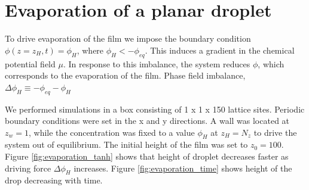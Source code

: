 \documentclass[11pt]{article}
\begin{document}
\section{Evaporation of a planar droplet}

To drive evaporation of the film we impose the boundary condition $\phi(z=z_{H},t)=\phi_{H}$, where $\phi_{H} < -\phi_{eq}$. This induces a gradient in the chemical potential field $\mu$. In response to this imbalance, the system reduces $\phi$, which corresponds to the evaporation of the film\cite{paper:evaporation}.
Phase field imbalance, $\Delta\phi_{H} \equiv -\phi_{eq} - \phi_{H}$
\par 
We performed simulations in a box consisting of  1 x 1 x 150 lattice sites. Periodic boundary conditions were set in the x and
y directions. A wall was located at $ z_{w} = 1 $, while the concentration
was fixed to a value $ \phi_{H}$ at $z_{H} = N_{z} $ to drive the system out of equilibrium. The initial height of the film was set to $z_{0} = 100$. Figure \ref{fig:evaporation_tanh} shows that height of droplet decreases faster as driving force $\Delta\phi_{H}$ increases. 
 Figure \ref{fig:evaporation_time} shows height of the drop decreasing with time. 
\end{document}
